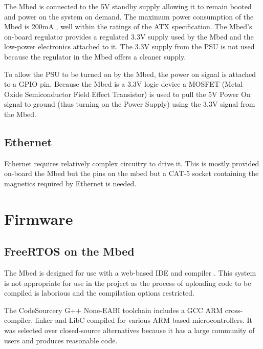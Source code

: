 			The Mbed is connected to the 5V standby supply allowing it to remain
			booted and power on the system on demand. The maximum power consumption
			of the Mbed is 200mA \cite{mbed}, well within the ratings of the ATX
			specification. The Mbed's on-board regulator provides a regulated 3.3V
			supply used by the Mbed and the low-power electronics attached to it.
			The 3.3V supply from the PSU is not used because the regulator in the
			Mbed offers a cleaner supply.
			
			To allow the PSU to be turned on by the Mbed, the power on signal is
			attached to a GPIO pin.  Because the Mbed is a 3.3V logic device a
			MOSFET (Metal Oxide Semiconductor Field Effect Transistor) is used to
			pull the 5V Power On signal to ground (thus turning on the Power Supply)
			using the 3.3V signal from the Mbed.
		
		\subsection{Ethernet}
			
			Ethernet requires relatively complex circuitry to drive it. This is
			mostly provided on-board the Mbed but the pins on the mbed but a
			CAT-5 socket containing the magnetics required by Ethernet is needed.
			
	
	\section{Firmware}
		
		
		\subsection{FreeRTOS on the Mbed}
			
			\label{sec:compiler}
			
			
			The Mbed is designed for use with a web-based IDE and compiler
			\cite{mbedcompiler}. This system is not appropriate for use in the project
			as the process of uploading code to be compiled is laborious and the
			compilation options restricted.
			
			The CodeSourcery G++ None-EABI toolchain includes a GCC ARM cross-compiler,
			linker and LibC compiled for various ARM based microcontrollers. It was
			selected over closed-source alternatives because it has a large community of
			users and produces reasonable code.
			
